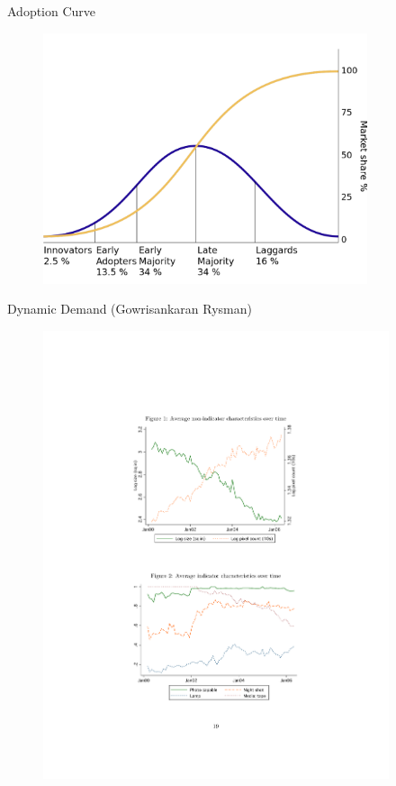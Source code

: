 \documentclass[xcolor=pdftex,dvipsnames,table,mathserif,aspectratio=169]{beamer}
\begin{document}
\begin{frame}{Adoption Curve}
\begin{figure}[htbp]
\begin{center}
\includegraphics[width=3.75in]{resources/s_curve.pdf}
\label{gandr2}
\end{center}
\end{figure}
\end{frame}

\begin{frame}{Dynamic Demand  (Gowrisankaran Rysman)}
\begin{figure}[htbp]
\begin{center}
\includegraphics[width=4in]{resources/gandr1.pdf}
\label{gandr1}
\end{center}
\end{figure}
\end{frame}
\end{document}
